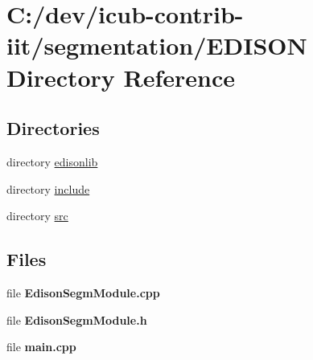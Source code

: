 \section{C\+:/dev/icub-\/contrib-\/iit/segmentation/\+E\+D\+I\+S\+O\+N Directory Reference}
\label{dir_6774956fae98bf52cd68df6f1d63bdc3}
\subsection*{Directories}
\begin{DoxyCompactItemize}
\item 
directory \hyperlink{dir_b3e20ad17b9697671cdbe91937eda888}{edisonlib}
\item 
directory \hyperlink{dir_ecf62e3282e881a5ee8afa1da2f46c7d}{include}
\item 
directory \hyperlink{dir_9337aeb1f0fb0d2aa68860b49d7692c0}{src}
\end{DoxyCompactItemize}
\subsection*{Files}
\begin{DoxyCompactItemize}
\item 
file {\bfseries Edison\+Segm\+Module.\+cpp}
\item 
file {\bfseries Edison\+Segm\+Module.\+h}
\item 
file {\bfseries main.\+cpp}
\end{DoxyCompactItemize}
